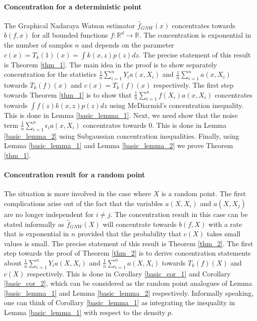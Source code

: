 \documentclass{article}
\begin{document}
\paragraph{Concentration for a deterministic point}
The Graphical Nadaraya Watson estimator $\hat{f}_{GNW}(x)$ concentrates towards $b(f,x)$
for all bounded functions $f\colon \mathbb{R}^d\to \mathbb{R}$. The concentration is exponential in the number of samples $n$ and  depends on the parameter $c(x)=T_k(1)(x)=\int k(x,z)p(z)dz$. The precise statement of this result is Theorem \ref{thm_1}. The main idea in the proof is to show separately concentration for the statistics $\frac{1}{n}\sum_{i=1}^nY_ia(x,X_i)$ and $\frac{1}{n}\sum_{i=1}^n a(x,X_i)$ towards $T_k(f)(x)$ and $c(x)=T_k(f)(x)$ respectively.
The first step towards Theorem \ref{thm_1} is to show that $\frac{1}{n}\sum_{i=1}^n f(X_i)a(x,X_i)$ concentrates towards $\int f(z)k(x,z)p(z)dz$ using McDiarmid's concentration inequality. This is done in Lemma \ref{basic_lemma_1}. Next, we  need show that the noise term $\frac{1}{n}\sum_{i=1}^n\epsilon_ia(x,X_i)$ concentrates towards $0$. This is done in Lemma \ref{basic_lemma_2} using Subgaussian concentration inequalities. Finally, using Lemma \ref{basic_lemma_1} and Lemma \ref{basic_lemma_2} we prove Theorem \ref{thm_1}.

\paragraph{Concentration result for a random point} The situation is more involved in the case where $X$ is a random point. The first complications arise out of the fact that the variables $a(X,X_i)$ and $a(X,X_j)$ are no longer independent for $i\neq j$. The concentration  result in this case can be stated informally as
$\hat{f}_{GNW}(X)$ will concentrate towards $b(f,X)$ with a rate that is exponential in $n$ provided that the probability that $c(X)$ takes small values is small. The precise statement of this result is Theorem \ref{thm_2}. The first step towards the proof of Theorem \ref{thm_2} is to derive concentration statements about $\frac{1}{n}\sum_{i=1}^nY_ia(X,X_i)$ and $\frac{1}{n}\sum_{i=1}^n a(X,X_i)$ towards $T_k(f)(X)$ and $c(X)$ respectively. This is done in Corollary \ref{basic_cor_1} and Corollary \ref{basic_cor_2}, which can be considered as the random point analogues of Lemma \ref{basic_lemma_1} and Lemma \ref{basic_lemma_2} respectively. Informally speaking, one can think of Corollary \ref{basic_lemma_1} as integrating the inequality in Lemma \ref{basic_lemma_1} with respect to the density $p$.
\end{document}
